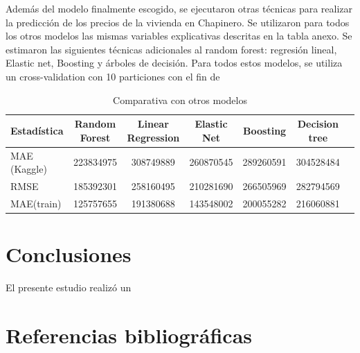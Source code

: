 \documentclass[
  11pt,
  letterpaper,
]{article}
\begin{document}
Además del modelo finalmente escogido, se ejecutaron otras técnicas para realizar la predicción de los precios de la vivienda en Chapinero. Se utilizaron para todos los otros modelos las mismas variables explicativas descritas en la tabla anexo. Se estimaron las siguientes técnicas adicionales al random forest: regresión lineal, Elastic net, Boosting y árboles de decisión. Para todos estos modelos, se utiliza un cross-validation con 10 particiones con el fin de

\begin{table}[ht]
\centering
\caption{Comparativa con otros modelos}
\begin{tabular}{lcccccr}
\hline \hline
Estadística & Random Forest &  Linear Regression & Elastic Net & Boosting & Decision tree \\
\hline
MAE (Kaggle) & 223834975 & 308749889 & 260870545 & 289260591 & 304528484  \\
RMSE & 185392301 & 258160495 & 210281690 & 266505969 & 282794569 \\
MAE(train) & 125757655 & 191380688 & 143548002 & 200055282 & 216060881 \\
\hline
\end{tabular}
\end{table}

\hypertarget{conclusiones}{%
\section{Conclusiones}\label{conclusiones}}

El presente estudio realizó un

\hypertarget{referencias-bibliogruxe1ficas}{%
\section{Referencias bibliográficas}\label{referencias-bibliogruxe1ficas}}
\end{document}
